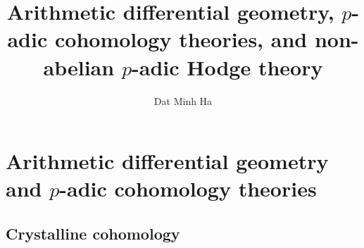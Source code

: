

\setcounter{section}{-1}





	\title{Arithmetic differential geometry, \texorpdfstring{$p$}{}-adic cohomology theories, and non-abelian \texorpdfstring{$p$}{}-adic Hodge theory}
	
	\author{Dat Minh Ha}
	\maketitle
	
	\begin{abstract}
	    
	\end{abstract}
	
	{
      \hypersetup{} 
      \dominitoc
      \tableofcontents %
    }
    
    
    
    \part{Arithmetic differential geometry and \texorpdfstring{$p$}{}-adic cohomology theories}
        \chapter{Crystalline cohomology}
            \begin{abstract}
                
            \end{abstract}
            
            \minitoc
            
            
            
            
            
